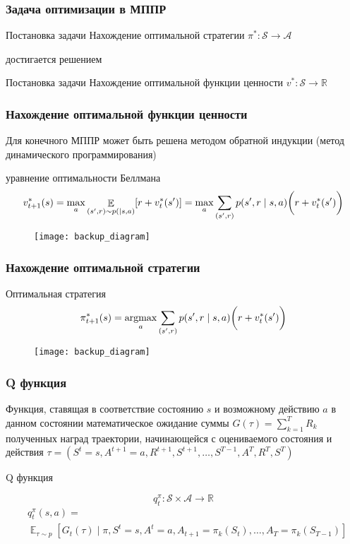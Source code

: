 \documentclass[notheorems]{beamer} %
\DeclareMathOperator*{\argmax}{argmax}
\begin{document}
\begin{frame}
	
	\frametitle{Задача оптимизации в МППР}
	\begin{block}{Постановка задачи}
		Нахождение оптимальной стратегии $\pi^* : \mathcal{S} \to \mathcal{A} $
	\end{block}
	достигается решением 
	\begin{block}{Постановка задачи}
		Нахождение оптимальной функции ценности $v^* : \mathcal{S} \to \mathbb{R} $
	\end{block}
\end{frame}


\begin{frame}
	
\frametitle{Нахождение оптимальной функции ценности}


Для конечного МППР может быть решена методом обратной индукции (метод динамического программирования)
\begin{block}{уравнение оптимальности Беллмана}
$$ v_ {t+1}^* (s) =\max_a \mathop{\mathbb{E}}_{(s',r) \sim p( \mid s,a)}[r + v_t^*(s')] = \max_a \sum_{(s',r)}p(s',r \mid s,a)\bigg{(}r + v_t^*(s')\bigg{)} $$
\end{block}
\begin{figure}
	\texttt{[image: backup\_diagram]}
\end{figure}
\end{frame}
\begin{frame}
\frametitle{Нахождение оптимальной  стратегии }

\begin{block}{Оптимальная стратегия}
	$$ \pi_{t+1}^* (s) = \argmax_a \sum_{(s',r)}p(s',r \mid s,a)\bigg{(}r + v_t^*(s')\bigg{)} $$
\end{block}
\begin{figure}
	\texttt{[image: backup\_diagram]}
\end{figure}
\end{frame}
\begin{frame}
	\frametitle{Q функция}	
	Функция, ставящая в соответствие состоянию $s$ и возможному  действию $a$ в данном состоянии математическое ожидание суммы $G(\tau) =  \sum_{k=1}^{T}R_k$ полученных наград траектории, начинающейся с оцениваемого состояния и действия $\tau =(S^t=s, A^{t+1}=a, R^{t+1}, S^{t+1}, \dots, S^{T-1}, A^{T}, R^{T}, S^T)$ 
	\begin{block}{Q функция}
		
		$$q_t^\pi: \mathcal{S} \times  \mathcal{A}  \to \mathbb{R}$$
		\begin{align*}
			 &q_t^\pi(s,a) = \\
			 &\mathop{\mathbb{E}}_{\tau \sim p}[G_t(\tau) \mid \pi,S^t=s,A^t=a, A_{t+1}=\pi_k(S_t) ,\dots,A_{T}=\pi_k(S_{T-1})] 
		\end{align*}
	\end{block}
	
\end{frame}
\end{document}
